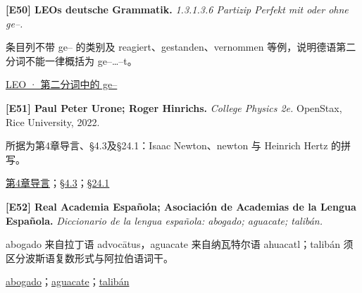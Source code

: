 \par\noindent\begin{minipage}{\linewidth}
\label{ref-50}\noindent\textbf{[E50] LEOs deutsche Grammatik.} \textit{1.3.1.3.6 Partizip Perfekt mit oder ohne ge–.}\par\nobreak
条目列不带 ge– 的类别及 reagiert、gestanden、vernommen 等例，说明德语第二分词不能一律概括为 ge–…–t。\par
{\small\href{https://dict.leo.org/grammatik/OnlineGrammar/InflectionRules/FRegeln-V/Texte/Partizip-mit-ohne-ge.html}{LEO · 第二分词中的 ge–}}\par
\par\end{minipage}\par

\par\noindent\begin{minipage}{\linewidth}
\label{ref-51}\noindent\textbf{[E51] Paul Peter Urone; Roger Hinrichs.} \textit{College Physics 2e.} OpenStax, Rice University, 2022.\par\nobreak
所据为第4章导言、§4.3及§24.1：Isaac Newton、newton 与 Heinrich Hertz 的拼写。\par
{\small\href{https://openstax.org/books/college-physics-2e/pages/4-introduction-to-dynamics-newtons-laws-of-motion}{第4章导言}；\href{https://openstax.org/books/college-physics-2e/pages/4-3-newtons-second-law-of-motion-concept-of-a-system}{§4.3}；\href{https://openstax.org/books/college-physics-2e/pages/24-1-maxwells-equations-electromagnetic-waves-predicted-and-observed}{§24.1}}\par
\par\end{minipage}\par

\par\noindent\begin{minipage}{\linewidth}
\label{ref-52}\noindent\textbf{[E52] Real Academia Española; Asociación de Academias de la Lengua Española.} \textit{Diccionario de la lengua española: abogado; aguacate; talibán.}\par\nobreak
abogado 来自拉丁语 advocātus，aguacate 来自纳瓦特尔语 ahuacatl；talibán 须区分波斯语复数形式与阿拉伯语词干。\par
{\small\href{https://dle.rae.es/abogado}{abogado}；\href{https://dle.rae.es/aguacate}{aguacate}；\href{https://dle.rae.es/talibán}{talibán}}\par
\par\end{minipage}\par

